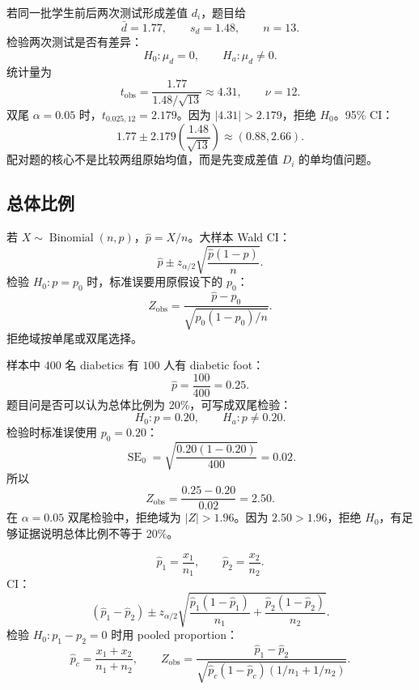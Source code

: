 \documentclass[11pt,a4paper]{article}
\newcommand{\SE}{\operatorname{SE}}
\begin{document}
\begin{examplebox}
若同一批学生前后两次测试形成差值 $d_i$，题目给
\[
  \bar d=1.77,\qquad s_d=1.48,\qquad n=13.
\]
检验两次测试是否有差异：
\[
  H_0:\mu_d=0,\qquad H_a:\mu_d\ne0.
\]
统计量为
\[
  t_{\mathrm{obs}}
  =
  \frac{1.77}{1.48/\sqrt{13}}
  \approx4.31,\qquad \nu=12.
\]
双尾 $\alpha=0.05$ 时，$t_{0.025,12}=2.179$。因为 $|4.31|>2.179$，拒绝 $H_0$。95\% CI：
\[
  1.77\pm2.179\left(\frac{1.48}{\sqrt{13}}\right)
  \approx
  (0.88,2.66).
\]
配对题的核心不是比较两组原始均值，而是先变成差值 $D_i$ 的单均值问题。
\end{examplebox}

\subsection{总体比例}

\begin{templatebox}[单总体比例]
若 $X\sim\operatorname{Binomial}(n,p)$，$\hat p=X/n$。大样本 Wald CI：
\[
  \boxed{
  \hat p\pm z_{\alpha/2}
  \sqrt{\frac{\hat p(1-\hat p)}{n}}
  }.
\]
检验 $H_0:p=p_0$ 时，标准误要用原假设下的 $p_0$：
\[
  Z_{\mathrm{obs}}
  =
  \frac{\hat p-p_0}
  {\sqrt{p_0(1-p_0)/n}}.
\]
拒绝域按单尾或双尾选择。
\end{templatebox}

\begin{examplebox}
样本中 $400$ 名 diabetics 有 $100$ 人有 diabetic foot：
\[
  \hat p=\frac{100}{400}=0.25.
\]
题目问是否可以认为总体比例为 20\%，可写成双尾检验：
\[
  H_0:p=0.20,\qquad H_a:p\ne0.20.
\]
检验时标准误使用 $p_0=0.20$：
\[
  \SE_0
  =
  \sqrt{\frac{0.20(1-0.20)}{400}}
  =
  0.02.
\]
所以
\[
  Z_{\mathrm{obs}}
  =
  \frac{0.25-0.20}{0.02}
  =
  2.50.
\]
在 $\alpha=0.05$ 双尾检验中，拒绝域为 $|Z|>1.96$。因为 $2.50>1.96$，拒绝 $H_0$，有足够证据说明总体比例不等于 20\%。
\end{examplebox}

\begin{templatebox}[两个独立总体比例]
\[
  \hat p_1=\frac{x_1}{n_1},
  \qquad
  \hat p_2=\frac{x_2}{n_2}.
\]
CI：
\[
  (\hat p_1-\hat p_2)
  \pm
  z_{\alpha/2}
  \sqrt{
    \frac{\hat p_1(1-\hat p_1)}{n_1}
    +
    \frac{\hat p_2(1-\hat p_2)}{n_2}
  }.
\]
检验 $H_0:p_1-p_2=0$ 时用 pooled proportion：
\[
  \hat p_c=\frac{x_1+x_2}{n_1+n_2},
  \qquad
  Z_{\mathrm{obs}}
  =
  \frac{\hat p_1-\hat p_2}
  {
  \sqrt{\hat p_c(1-\hat p_c)(1/n_1+1/n_2)}
  }.
\]
\end{templatebox}
\end{document}
